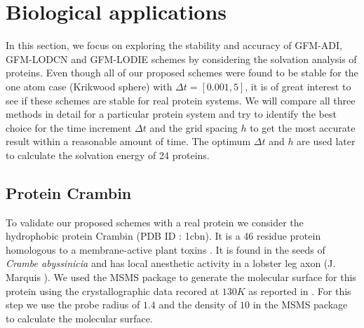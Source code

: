    
\section{Biological applications}

In this section, we focus on exploring the stability and accuracy of GFM-ADI, GFM-LODCN and GFM-LODIE schemes by considering the solvation analysis of proteins. Even though all of our proposed schemes were found to be stable for the one atom case (Krikwood sphere) with $\Delta t =[0.001,5]$, it is of great interest to see if these schemes are stable for real protein systems. We will compare all three methods in detail for a particular protein system and try to identify the best choice for the time increment $\Delta t $ and the grid spacing $h$ to get the most accurate result within a reasonable amount of time. The optimum $\Delta t$ and $h$ are used later to calculate the solvation energy of 24 proteins.      

\subsection{Protein Crambin } To validate our proposed schemes with a real protein we consider the hydrophobic protein Crambin (PDB ID : 1cbn). It is a 46 residue protein homologous to a membrane-active plant toxins \cite{1cbn_paper}. It is found in the seeds of \textit{Crambe abyssinicia} and has local anesthetic activity in a lobster leg axon (J. Marquis \cite{1cbn_paper}). We used the MSMS package to generate the molecular surface for this protein using the crystallographic data recored at $130 K$ as reported in \cite{1cbn_paper}. For this step we use the probe radius of $1.4$ and the density of $10$ in the MSMS package to calculate the molecular surface.

